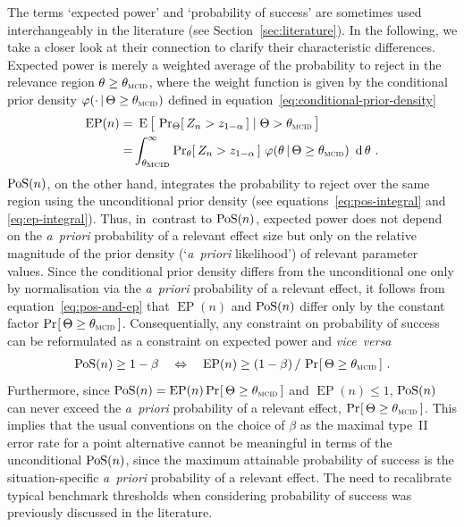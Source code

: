 \documentclass{article}
\renewcommand{\Pr}{\operatorname{Pr}}
\newcommand{\E}{\operatorname{E}}
\newcommand{\EP}{\operatorname{EP}}
\begin{document}
The terms `expected power' and `probability of success' are sometimes used interchangeably in the literature (see Section~\ref{sec:literature}).
In the following, we take a closer look at their connection to clarify their characteristic differences.
Expected power is merely a weighted average of the probability to reject in the relevance region $\theta\geq\mcid$, where the weight function is given by the conditional prior density  $\varphi(\cdot\,|\,\Theta\geq \mcid)$ defined in equation~\eqref{eq:conditional-prior-density}
\begin{align}
    \EP(n) =&\ \E\big[\, \Pr_{\Theta}[\,Z_n >\criticalvalue\,] \mid \Theta > \mcid\,\big] \\
        =& \int_{\mcid}^\infty \Pr_\theta[\,Z_n > \criticalvalue\,]\ \varphi(\theta\,|\,\Theta\geq \mcid)\ \operatorname{d} \theta \ .
        \label{eq:ep-integral}
\end{align}
$\operatorname{PoS}(n)$, on the other hand, integrates the probability to reject over the same region using the unconditional prior density (see equations~\eqref{eq:pos-integral} and \eqref{eq:ep-integral}).
Thus, in~contrast to $\operatorname{PoS}(n)$, expected power does not depend on the \textit{a~priori} probability of a relevant effect size but only on the relative magnitude of the prior density (`\textit{a~priori} likelihood') of relevant parameter values.
Since the conditional prior density differs from the unconditional one only by normalisation via the \textit{a~priori} probability of a relevant effect,
it follows from equation~\eqref{eq:pos-and-ep} that $\EP(n)$ and $\operatorname{PoS}(n)$ differ only by the constant factor $ \Pr_{}[\,\Theta \geq \mcid\,]$.
Consequentially, any constraint on probability of success can be reformulated as a constraint on expected power and \textit{vice~versa}
\begin{align}
    \PoS(n)\geq 1 - \beta
    \quad \Leftrightarrow \quad
    \EP(n)\geq (1 - \beta)\,/\,\Pr_{ }[\,\Theta \geq \mcid\,] \ .
    \label{eq:pos-to-ep-cnstr}
\end{align}
Furthermore, since $\PoS(n) = \EP(n)\Pr_{}[\,\Theta \geq \mcid\,]$ and $\EP(n)\leq 1$, $\operatorname{PoS}(n)$ can never exceed the \textit{a~priori} probability of a relevant effect, $\Pr_{}[\,\Theta \geq \mcid\,]$.
This implies that the usual conventions on the choice of $\beta$
as the maximal type~II error rate for a point alternative
cannot be meaningful in terms of the unconditional $\operatorname{PoS}(n)$, since the maximum attainable probability of success is the situation-specific \textit{a~priori} probability of a relevant effect.
The need to recalibrate typical benchmark thresholds when considering probability of success was previously discussed in the literature.
\end{document}
